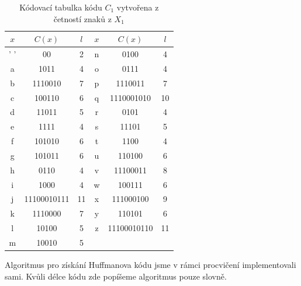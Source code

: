 \documentclass[czech]{mvi-report}
\begin{document}
\begin{table}
  \caption{Kódovací tabulka kódu $C_1$ vytvořena z četností znaků z $X_1$}
  \centering
  \begin{tabular}{|ccc|ccc|}
  \hline
  \rowcolor[rgb]{0.722,0.722,0.722} $x$ & $C(x)$        & $l$  & $x$ & $C(x)$        & $l$   \\
  \hline
  \rowcolor[rgb]{0.82,0.82,0.82} ' '  & 00          & 2  & n & 0100        & 4   \\
  \rowcolor[rgb]{0.941,0.941,0.941} a & 1011        & 4  & o & 0111        & 4   \\
  \rowcolor[rgb]{0.722,0.722,0.722} b & 1110010     & 7  & p & 1110011     & 7   \\
  \rowcolor[rgb]{0.82,0.82,0.82} c    & 100110      & 6  & q & 1110001010  & 10  \\
  \rowcolor[rgb]{0.941,0.941,0.941} d & 11011       & 5  & r & 0101        & 4   \\
  \rowcolor[rgb]{0.722,0.722,0.722} e & 1111        & 4  & s & 11101       & 5   \\
  \rowcolor[rgb]{0.82,0.82,0.82} f    & 101010      & 6  & t & 1100        & 4   \\
  \rowcolor[rgb]{0.941,0.941,0.941} g & 101011      & 6  & u & 110100      & 6   \\
  \rowcolor[rgb]{0.722,0.722,0.722} h & 0110        & 4  & v & 11100011    & 8   \\
  \rowcolor[rgb]{0.82,0.82,0.82} i    & 1000        & 4  & w & 100111      & 6   \\
  \rowcolor[rgb]{0.941,0.941,0.941} j & 11100010111 & 11 & x & 111000100   & 9   \\
  \rowcolor[rgb]{0.722,0.722,0.722} k & 1110000     & 7  & y & 110101      & 6   \\
  \rowcolor[rgb]{0.82,0.82,0.82} l    & 10100       & 5  & z & 11100010110 & 11  \\
  \rowcolor[rgb]{0.941,0.941,0.941} m & 10010       & 5  &   &             &     \\
  \hline
  \end{tabular}
  \label{tab:codebook}
  \end{table}

Algoritmus pro získání Huffmanova kódu jsme v rámci procvičení implementovali sami. Kvůli délce kódu zde popíšeme algoritmus pouze slovně.
\end{document}
